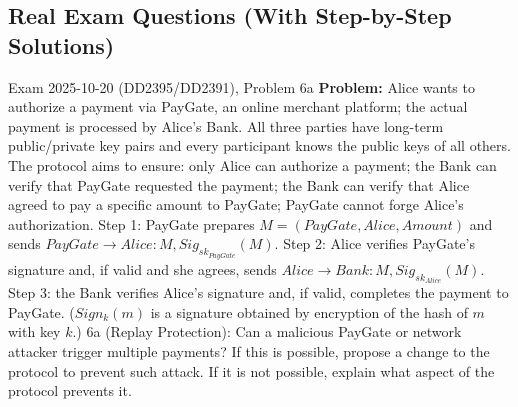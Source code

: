 \documentclass[12pt, a4paper]{article}
\begin{document}
\subsection*{Real Exam Questions (With Step-by-Step Solutions)}

\begin{practicebox}{Exam 2025-10-20 (DD2395/DD2391), Problem 6a}
\textbf{Problem:} Alice wants to authorize a payment via PayGate, an online merchant platform; the actual payment is processed by Alice's Bank. All three parties have long-term public/private key pairs and every participant knows the public keys of all others. The protocol aims to ensure: only Alice can authorize a payment; the Bank can verify that PayGate requested the payment; the Bank can verify that Alice agreed to pay a specific amount to PayGate; PayGate cannot forge Alice's authorization. Step 1: PayGate prepares $M = (PayGate, Alice, Amount)$ and sends $PayGate \to Alice : M, Sig_{sk_{PayGate}}(M)$. Step 2: Alice verifies PayGate's signature and, if valid and she agrees, sends $Alice \to Bank : M, Sig_{sk_{Alice}}(M)$. Step 3: the Bank verifies Alice's signature and, if valid, completes the payment to PayGate. ($Sign_k(m)$ is a signature obtained by encryption of the hash of $m$ with key $k$.) 6a (Replay Protection): Can a malicious PayGate or network attacker trigger multiple payments? If this is possible, propose a change to the protocol to prevent such attack. If it is not possible, explain what aspect of the protocol prevents it.


\end{practicebox}
\end{document}
